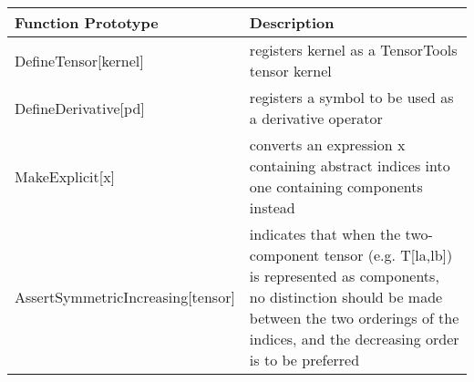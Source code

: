 \documentclass{report}
\newcommand{\tablewidth}{\textwidth}
\begin{document}
\begin{center}
  \begin{tabularx}{\tablewidth}{|l|X|}
    \hline
    \bf Function Prototype & \bf Description\\
    \hline
    DefineTensor[kernel] & 
    registers kernel as a TensorTools tensor kernel\\
    \hline
    DefineDerivative[pd] & 
    registers a symbol to be used as a derivative operator\\
    \hline
    MakeExplicit[x] & 
    converts an expression x containing abstract indices into one containing 
    components instead\\
    \hline
    AssertSymmetricIncreasing[tensor] & 
    indicates that when the two-component tensor (e.g. T[la,lb]) is
    represented as components, no distinction should be made between
    the two orderings of the indices, and the decreasing order is to
    be preferred\\
    \hline


\end{tabularx}
\end{center}
\end{document}
